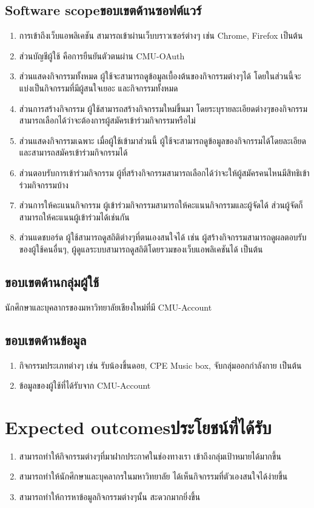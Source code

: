 \subsection{\ifenglish Software scope\else ขอบเขตด้านซอฟต์แวร์\fi}
\begin{enumerate}
    \item การเข้าถึงเว็บแอพลิเคชัน สามารถเข้าผ่านเว็บบราวเซอร์ต่างๆ เช่น Chrome, Firefox เป็นต้น
    \item ส่วนบัญชีผู้ใช้ คือการยืนยันตัวตนผ่าน CMU-OAuth
    \item ส่วนแสดงกิจกรรมทั้งหมด ผู้ใช้จะสามารถดูข้อมูลเบื้องต้นของกิจกรรมต่างๆได้ โดยในส่วนนี้จะแบ่งเป็นกิจกรรมที่มีผู้สนใจเยอะ และกิจกรรมทั้งหมด
    \item ส่วนการสร้างกิจกรรม ผู้ใช้สามารถสร้างกิจกรรมใหม่ขึ้นมา โดยระบุรายละเอียดต่างๆของกิจกรรม สามารถเลือกได้ว่าจะต้องการผู้สมัครเข้าร่วมกิจกรรมหรือไม่
    \item ส่วนแสดงกิจกรรมเฉพาะ เมื่อผู้ใช้เข้ามาส่วนนี้ ผู้ใช้จะสามารถดูข้อมูลของกิจกรรมได้โดยละเอียด และสามารถสมัครเข้าร่วมกิจกรรมได้
    \item ส่วนตอบรับการเข้าร่วมกิจกรรม ผู้ที่สร้างกิจกรรมสามารถเลือกได้ว่าจะให้ผู้สมัครคนไหนมีสิทธิเข้าร่วมกิจกรรมบ้าง
    \item ส่วนการให้คะแนนกิจกรรม ผู้เข้าร่วมกิจกรรมสามารถให้คะแนนกิจกรรมและผู้จัดได้ ส่วนผู้จัดก็สามารถให้คะแนนผู้เข้าร่วมได้เช่นกัน
    \item ส่วนแดชบอร์ด ผู้ใช้สามารถดูสถิติต่างๆที่ตนเองสนใจได้ เช่น ผู้สร้างกิจกรรมสามารถดูผลตอบรับของผู้ใช้คนอื่นๆ, ผู้ดูแลระบบสามารถดูสถิติโดยรวมของเว็บแอพลิเคชันได้ เป็นต้น
\end{enumerate}

\subsection{ขอบเขตด้านกลุ่มผู้ใช้}
นักศึกษาและบุคลากรของมหาวิทยาลัยเชียงใหม่ที่มี CMU-Account

\subsection{ขอบเขตด้านข้อมูล}
\begin{enumerate}
    \item กิจกรรมประเภทต่างๆ เช่น รับน้องขึ้นดอย, CPE Music box, จับกลุ่มออกกำลังกาย เป็นต้น
    \item ข้อมูลของผู้ใช้ที่ได้รับจาก CMU-Account
\end{enumerate}

\section{\ifenglish Expected outcomes\else ประโยชน์ที่ได้รับ\fi}
\begin{enumerate}
    \item สามารถทำให้กิจกรรมต่างๆที่มาฝากประกาศในช่องทางเรา เข้าถึงกลุ่มเป้าหมายได้มากขึ้น
    \item สามารถทำให้นักศึกษาและบุคลากรในมหาวิทยาลัย ได้เห็นกิจกรรมที่ตัวเองสนใจได้ง่ายขึ้น
    \item สามารถทำให้การหาข้อมูลกิจกรรมต่างๆนั้น สะดวกมากยิ่งขึ้น
\end{enumerate}

